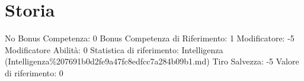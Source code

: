 \section{Storia}\label{storia}

\begin{description}
\tightlist
\item[Tags: ABI]
No Bonus Competenza: 0 Bonus Competenza di Riferimento: 1 Modificatore:
-5 Modificatore Abilità: 0 Statistica di riferimento: Intelligenza
(Intelligenza\%207691b0d2fe9a47fc8edfcc7a284b09b1.md) Tiro Salvezza: -5
Valore di riferimento: 0
\end{description}
